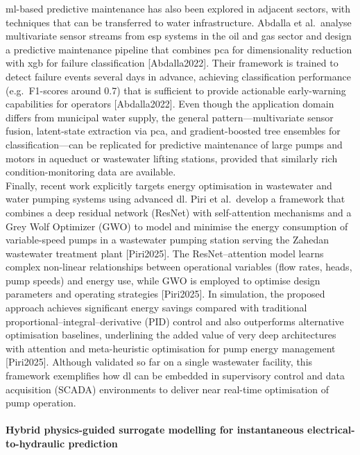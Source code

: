 \acrshort{ml}-based predictive maintenance has also been explored in adjacent sectors, with techniques that can be transferred to water infrastructure. Abdalla et al.\ analyse multivariate sensor streams from \acrfull{esp} systems in the oil and gas sector and design a predictive maintenance pipeline that combines \acrshort{pca} for dimensionality reduction with \acrfull{xgb} for failure classification [Abdalla2022]. Their framework is trained to detect failure events several days in advance, achieving classification performance (e.g.\ F1-scores around 0.7) that is sufficient to provide actionable early-warning capabilities for operators [Abdalla2022]. Even though the application domain differs from municipal water supply, the general pattern—multivariate sensor fusion, latent-state extraction via \acrshort{pca}, and gradient-boosted tree ensembles for classification—can be replicated for predictive maintenance of large pumps and motors in aqueduct or wastewater lifting stations, provided that similarly rich condition-monitoring data are available.\\

Finally, recent work explicitly targets energy optimisation in wastewater and water pumping systems using advanced \acrshort{dl}. Piri et al.\ develop a framework that combines a deep residual network (ResNet) with self-attention mechanisms and a Grey Wolf Optimizer (GWO) to model and minimise the energy consumption of variable-speed pumps in a wastewater pumping station serving the Zahedan wastewater treatment plant [Piri2025]. The ResNet–attention model learns complex non-linear relationships between operational variables (flow rates, heads, pump speeds) and energy use, while GWO is employed to optimise design parameters and operating strategies [Piri2025]. In simulation, the proposed approach achieves significant energy savings compared with traditional proportional–integral–derivative (PID) control and also outperforms alternative optimisation baselines, underlining the added value of very deep architectures with attention and meta-heuristic optimisation for pump energy management [Piri2025]. Although validated so far on a single wastewater facility, this framework exemplifies how \acrshort{dl} can be embedded in supervisory control and data acquisition (SCADA) environments to deliver near real-time optimisation of pump operation.\\



\paragraph{Hybrid physics-guided surrogate modelling for instantaneous electrical-to-hydraulic prediction}

